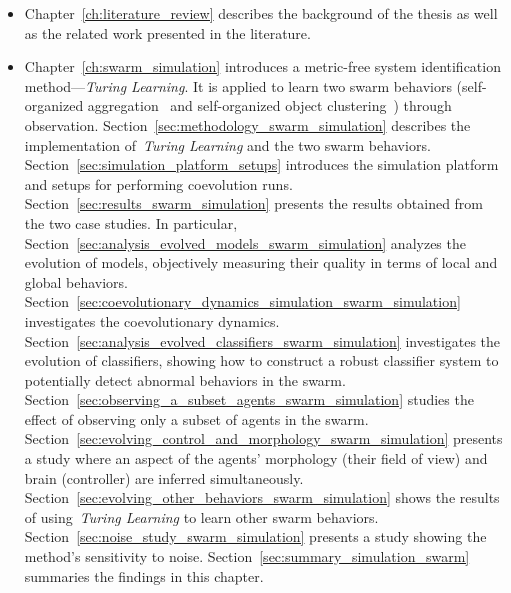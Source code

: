 \begin{itemize}
\item Chapter~\ref{ch:literature_review} describes the background of the thesis as well as the related work presented in the literature. 

\item Chapter~\ref{ch:swarm_simulation} introduces a metric-free system identification method---\textit{Turing Learning}. It is applied to learn two swarm behaviors (self-organized aggregation~\cite{Gauci2014_ijrr} and self-organized object clustering~\cite{Melvin2014_aamas}) through observation. Section~\ref{sec:methodology_swarm_simulation} describes the implementation of~\textit{Turing Learning} and the two swarm behaviors. Section~\ref{sec:simulation_platform_setups} introduces the simulation platform and setups for performing coevolution runs. Section~\ref{sec:results_swarm_simulation} presents the results obtained from the two case studies. In particular, Section~\ref{sec:analysis_evolved_models_swarm_simulation} analyzes the evolution of models, objectively measuring their quality in terms of local and global behaviors. Section~\ref{sec:coevolutionary_dynamics_simulation_swarm_simulation} investigates the coevolutionary dynamics. Section~\ref{sec:analysis_evolved_classifiers_swarm_simulation} investigates the evolution of classifiers, showing how to construct a robust classifier system to potentially detect abnormal behaviors in the swarm. Section~\ref{sec:observing_a_subset_agents_swarm_simulation} studies the effect of observing only a subset of agents in the swarm. Section~\ref{sec:evolving_control_and_morphology_swarm_simulation} presents a study where an aspect of the agents' morphology (their field of view) and brain (controller) are inferred simultaneously. Section~\ref{sec:evolving_other_behaviors_swarm_simulation} shows the results of using~\textit{Turing Learning} to learn other swarm behaviors. Section~\ref{sec:noise_study_swarm_simulation} presents a study showing the method's sensitivity to noise. Section~\ref{sec:summary_simulation_swarm} summaries the findings in this chapter.


\end{itemize}
